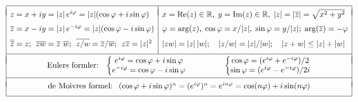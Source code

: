 \documentclass{article}
\begin{document}
$  %
\begin{array}{|l|l|}
  \hline & \\*[-8pt]
  z=x+iy    =|z|\,e^{ i\varphi}=|z|(\cos\varphi+i\sin\varphi) & 
 x=\text{Re}(z)\in\Rone,\;
 y=\text{Im}(z)\in\Rone,\;
 |z| = |\ob z| = \sqrt{x^2+y^2}
  \EndRow
  \ob z=x-iy=|z|\,e^{-i\varphi}=|z|(\cos\varphi-i\sin\varphi) & 
  \varphi = \arg (z), 
  \;
  \cos\varphi = x/|z|,
  \;
  \sin\varphi = y/|z|  ;
  \;
  \arg(\ob z) = -\varphi
  \EndRow
  \ob{\ob z} = z ;
  \;\,
  \ob{zw} = \ob z\,\,\ob w ;
  \;\,
  \ob{z / w} = \ob z/\ob w ;
  \;\,
  z\ob z = |z|^2
  &
  |zw| = |z|\,|w| ;
  \quad
  |z/w| = |z|/|w| ;
  \quad
  |z+w| \le |z| + |w|
  \EndRow \cline{1-2} \multicolumn{2}{|l|}{}\\*[-9pt]
  \multicolumn{2}{|c|}{
  \text{Eulers formler: \ }
  \left\{\begin{matrix}
  e^{i\varphi}   =  \cos \varphi + i \sin \varphi\\
  e^{-i\varphi}  =  \cos \varphi - i \sin \varphi\\
  \end{matrix}\right.
  \hfil
  \left\{\begin{matrix}
    \cos\varphi = (e^{i\varphi}+e^{-i\varphi})/2\\
    \sin\varphi = (e^{i\varphi}-e^{-i\varphi})/2i\\
  \end{matrix}\right.
  }
  \\*[9pt]
  \cline{1-2}
  \multicolumn{2}{|l|}{}\\*[-7pt]
  \multicolumn{2}{|c|}{\text{de Moivres formel: \ }
  (\cos\varphi+i\sin\varphi)^n 
  =(e^{i\varphi})^n
  =e^{in\varphi}
  =\cos(n\varphi)+i\sin(n\varphi) 
  }
  \EndRow
  \hline
\end{array}
$
\end{document}
